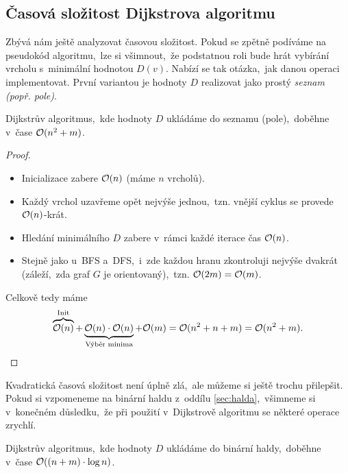 \subsection{Časová složitost Dijkstrova algoritmu}

Zbývá nám ještě analyzovat časovou složitost. Pokud se zpětně podíváme na pseudokód algoritmu,~lze si všimnout,~že podstatnou roli bude hrát vybírání vrcholu s~minimální hodnotou $D(v)$. Nabízí se tak otázka,~jak danou operaci implementovat. První variantou je hodnoty $D$ realizovat jako prostý \emph{seznam (popř. pole)}.
\begin{theorem}
    Dijkstrův algoritmus,~kde hodnoty $D$ ukládáme do seznamu (pole),~doběhne v~čase $\mathcal{O}(n^2+m)$.
\end{theorem}
\begin{proof}
    \begin{itemize}
        \item Inicializace zabere $\mathcal{O}(n)$ (máme $n$ vrcholů).
        \item Každý vrchol uzavřeme opět nejvýše jednou,~tzn. vnější cyklus se provede $\mathcal{O}(n)$-krát.
        \item Hledání minimálního $D$ zabere v~rámci každé iterace čas $\mathcal{O}(n)$.
        \item Stejně jako u~BFS a~DFS,~i~zde každou hranu zkontroluji nejvýše dvakrát (záleží,~zda graf $G$ je orientovaný),~tzn. $\mathcal{O}(2m)=\mathcal{O}(m)$.
    \end{itemize}
    Celkově tedy máme
    \[\overbrace{\mathcal{O}(n)}^{\text{Init}}+\underbrace{\mathcal{O}(n)\cdot\mathcal{O}(n)}_{\text{Výběr minima}}+\mathcal{O}(m)=\mathcal{O}(n^2+n+m)=\mathcal{O}(n^2+m).\]
\end{proof}
Kvadratická časová složitost není úplně zlá,~ale můžeme si ještě trochu přilepšit. Pokud si vzpomeneme na binární haldu z~oddílu \ref{sec:halda},~všimneme si v~konečném důsledku,~že při použití v~Dijkstrově algoritmu se některé operace zrychlí.
\begin{theorem}
    Dijkstrův algoritmus,~kde hodnoty $D$ ukládáme do binární haldy,~doběhne v~čase $\mathcal{O}((n+m)\cdot\log{n})$.
\end{theorem}
